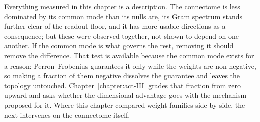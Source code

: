 Everything measured in this chapter is a description. The connectome is less
dominated by its common mode than its nulls are, its Gram spectrum stands
further clear of the readout floor, and it has more usable directions as a
consequence; but these were observed together, not shown to depend on one
another. If the common mode is what governs the rest, removing it should remove
the difference. That test is available because the common mode exists for a
reason: Perron--Frobenius guarantees it only while the weights are non-negative,
so making a fraction of them negative dissolves the guarantee and leaves the
topology untouched. Chapter~\ref{chapter:act-III} grades that fraction from zero
upward and asks whether the dimensional advantage goes with the mechanism
proposed for it. Where this chapter compared weight families side by side, the
next intervenes on the connectome itself.


